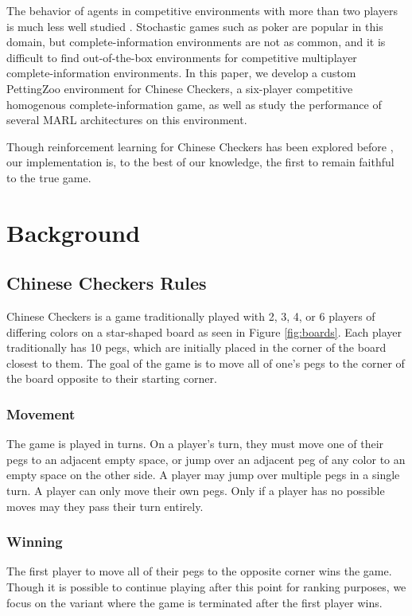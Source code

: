\documentclass[12pt, a4paper, twocolumn]{article}
\begin{document}
The behavior of agents in competitive environments with more than two players is much less well studied \cite{ArticleReference4}. Stochastic games such as poker are popular in this domain, but complete-information environments are not as common, and it is difficult to find out-of-the-box environments for competitive multiplayer complete-information environments. In this paper, we develop a custom PettingZoo environment for Chinese Checkers, a six-player competitive homogenous complete-information game, as well as study the performance of several MARL architectures on this environment.

Though reinforcement learning for Chinese Checkers has been explored before \cite{ChineseCheckersRL1} \cite{ChineseCheckersRL2}, our implementation is, to the best of our knowledge, the first to remain faithful to the true game.

\section{Background}

\subsection{Chinese Checkers Rules \cite{ChineseCheckersRules}}

Chinese Checkers is a game traditionally played with 2, 3, 4, or 6 players of differing colors on a star-shaped board as seen in Figure \ref{fig:boards}. Each player traditionally has 10 pegs, which are initially placed in the corner of the board closest to them. The goal of the game is to move all of one's pegs to the corner of the board opposite to their starting corner.

\subsubsection{Movement}
The game is played in turns. On a player's turn, they must move one of their pegs to an adjacent empty space, or jump over an adjacent peg of any color to an empty space on the other side. A player may jump over multiple pegs in a single turn. A player can only move their own pegs. Only if a player has no possible moves may they pass their turn entirely.

\subsubsection{Winning}
The first player to move all of their pegs to the opposite corner wins the game. Though it is possible to continue playing after this point for ranking purposes, we focus on the variant where the game is terminated after the first player wins.
\end{document}
